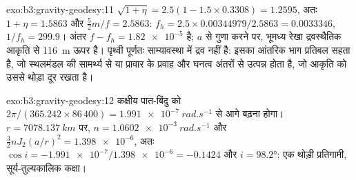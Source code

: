 \begin{solution}{exo:b3:gravity-geodesy:11}
$\sqrt{1 + \eta} = 2.5(1 - 1.5\times0.3308) = 1.2595$, अतः $1 + \eta = 1.5863$
और $\tfrac52m/f = 2.5863$: $f_h = 2.5\times0.00344979/2.5863 = \num{0.0033346}$,
$1/f_h = 299.9$। अंतर $f - f_h = \num{1.82e-5}$ है; $a$ से गुणा करने पर,
भूमध्य रेखा द्रवस्थैतिक आकृति से \qty{116}{m} ऊपर है। पृथ्वी
पूर्णतः साम्यावस्था में द्रव नहीं है: इसका आंतरिक भाग प्रतिबल सहता है, जो स्थलमंडल की सामर्थ्य से
या प्रावार के प्रवाह और घनत्व अंतरों से उत्पन्न होता है, जो
आकृति को उससे थोड़ा दूर रखता है।
\end{solution}

\begin{solution}{exo:b3:gravity-geodesy:12}
कक्षीय पात-बिंदु को $2\pi/(365.242\times86\,400) =
\qty{1.991e-7}{rad.s^{-1}}$ से आगे बढ़ना होगा। $r = \qty{7078.137}{km}$ पर, $n =
\qty{1.0602e-3}{rad.s^{-1}}$ और $\tfrac32nJ_2(a/r)^2 = \num{1.398e-6}$, अतः
$\cos i = -\num{1.991e-7}/\num{1.398e-6} = -0.1424$ और $i = \ang{98.2}$: एक
थोड़ी प्रतिगामी, सूर्य-तुल्यकालिक कक्षा।
\end{solution}

